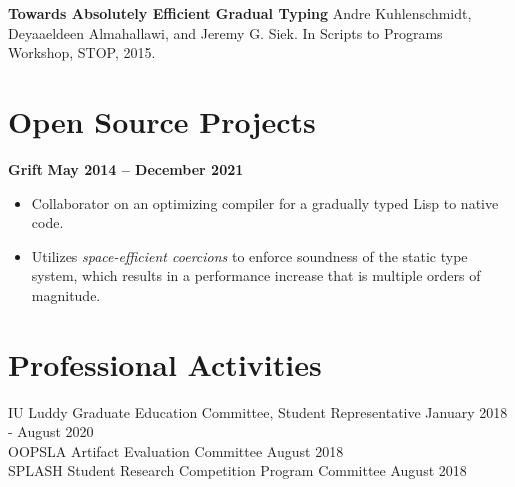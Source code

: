 \documentclass[resmargin,line]{res}
\begin{document}
\begin{resume}
{\bf Towards Absolutely Efficient Gradual Typing}
Andre Kuhlenschmidt, Deyaaeldeen Almahallawi, and Jeremy G. Siek.
In Scripts to Programs Workshop, STOP, 2015.

\section{\sc Open Source Projects}

{\bf Grift}
\hfill {\bf May 2014 -- December 2021}\\
\vspace*{-.35cm}
\begin{itemize}
\item Collaborator on an optimizing compiler for a gradually typed
  Lisp to native code.
\item Utilizes {\em space-efficient coercions} to enforce soundness of
  the static type system, which results in a performance increase that
  is multiple orders of magnitude.
\end{itemize}


\section{\sc Professional Activities}

IU Luddy Graduate Education Committee, Student Representative
\hfill January 2018 - August 2020\\
OOPSLA Artifact Evaluation Committee \hfill August 2018\\
SPLASH Student Research Competition Program Committee \hfill August 2018

\end{resume}
\end{document}
